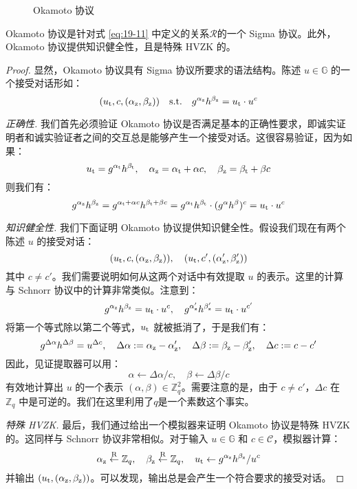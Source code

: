 \begin{figure}
  \centering
  
  \caption{Okamoto 协议}
  \label{fig:19-6}
\end{figure}

\begin{theorem}
Okamoto 协议是针对式 \ref{eq:19-11} 中定义的关系$\mathcal{R}$的一个 Sigma 协议。此外，Okamoto 协议提供知识健全性，且是特殊 HVZK 的。
\end{theorem}

\begin{proof}
显然，Okamoto 协议具有 Sigma 协议所要求的语法结构。陈述 $u\in\mathbb{G}$ 的一个接受对话形如：
\[
(u_{\rm t},c,(\alpha_{\rm z},\beta_{\rm z}))
\quad\text{s.t.}\quad
g^{\alpha_{\rm z}}h^{\beta_{\rm z}}=u_{\rm t}\cdot u^c
\]

\noindent
\emph{正确性.}
我们首先必须验证 Okamoto 协议是否满足基本的正确性要求，即诚实证明者和诚实验证者之间的交互总是能够产生一个接受对话。这很容易验证，因为如果：
\[
u_{\rm t}=g^{\alpha_{\rm t}}h^{\beta_{\rm t}},
\quad
\alpha_{\rm z}=\alpha_{\rm t}+\alpha c,
\quad
\beta_{\rm z}=\beta_{\rm t}+\beta c
\]
则我们有：
\[
g^{\alpha_{\rm z}}h^{\beta_{\rm z}}=
g^{\alpha_{\rm t}+\alpha c}h^{\beta_{\rm t}+\beta c}=
g^{\alpha_{\rm t}}h^{\beta_{\rm t}}\cdot(g^\alpha h^\beta)^c=
u_{\rm t}\cdot u^c
\]

\noindent
\emph{知识健全性.}
我们下面证明 Okamoto 协议提供知识健全性。假设我们现在有两个陈述 $u$ 的接受对话：
\[
(u_{\rm t},c,(\alpha_{\rm z},\beta_{\rm z})),
\quad
(u_{\rm t},c',(\alpha_{\rm z}',\beta_{\rm z}'))
\]
其中 $c\neq c'$。我们需要说明如何从这两个对话中有效提取 $u$ 的表示。这里的计算与 Schnorr 协议中的计算非常类似。注意到：
\[
g^{\alpha_{\rm z}}h^{\beta_{\rm z}}=u_{\rm t}\cdot u^c,
\quad
g^{\alpha_{\rm z}'}h^{\beta_{\rm z}'}=u_{\rm t}\cdot u^{c'}
\]
将第一个等式除以第二个等式，$u_{\rm t}$ 就被抵消了，于是我们有：
\[
g^{\Delta\alpha}h^{\Delta\beta}=u^{\Delta c},
\quad
\Delta\alpha:=\alpha_{\rm z}-\alpha_{\rm z}',
\quad
\Delta\beta:=\beta_{\rm z}-\beta_{\rm z}',
\quad
\Delta c:=c-c'
\]
因此，见证提取器可以用：
\[
\alpha\leftarrow{\Delta\alpha}/{c},
\quad
\beta\leftarrow{\Delta\beta}/{c}
\]
有效地计算出 $u$ 的一个表示 $(\alpha,\beta)\in\mathbb{Z}_q^2$。需要注意的是，由于 $c\neq c'$，$\Delta c$ 在 $\mathbb{Z}_q$ 中是可逆的。我们在这里利用了$q$是一个素数这个事实。

\vspace{5pt}

\noindent
\emph{特殊 HVZK.}
最后，我们通过给出一个模拟器来证明 Okamoto 协议是特殊 HVZK 的。这同样与 Schnorr 协议非常相似。对于输入 $u\in\mathbb{G}$ 和 $c\in\mathcal{C}$，模拟器计算：
\[
\alpha_{\rm z}\overset{\rm R}\leftarrow\mathbb{Z}_q,
\quad
\beta_{\rm z}\overset{\rm R}\leftarrow\mathbb{Z}_q,
\quad
u_{\rm t}\leftarrow{g^{\alpha_{\rm z}}h^{\beta_{\rm z}}}/{u^c}
\]
并输出 $(u_{\rm t},(\alpha_{\rm z},\beta_{\rm z}))$。可以发现，输出总是会产生一个符合要求的接受对话。


\end{proof}
